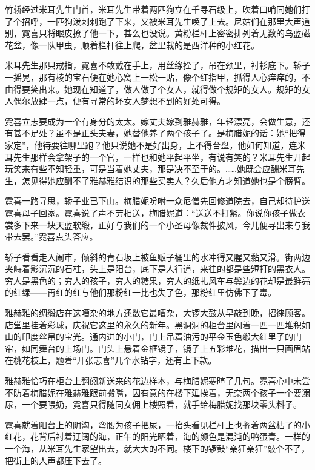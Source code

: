 \par 竹轿经过米耳先生门首，米耳先生带着两匹狗立在千寻石级上，吹着口哨同她们打了个招呼，一匹狗泼剌剌跑了下来，又被米耳先生唤了上去。尼姑们在那里大声道别，霓喜只将眼皮撩了他一下，甚么也没说。黄粉栏杆上密密排列着无数的乌蓝磁花盆，像一队甲虫，顺着栏杆往上爬，盆里栽的是西洋种的小红花。
\par 米耳先生那只戒指，霓喜不敢戴在手上，用丝绦拴了，吊在颈里，衬衫底下。轿子一摇晃，那有棱的宝石便在她心窝上一松一贴，像个红指甲，抓得人心痒痒的，不由得要笑出来。她现在知道了，做人做了个女人，就得做个规矩的女人。规矩的女人偶尔放肆一点，便有寻常的坏女人梦想不到的好处可得。
\par 霓喜立志要成为一个有身分的太太。嫁丈夫嫁到雅赫雅，年轻漂亮，会做生意，还有甚不足处？虽不是正头夫妻，她替他养了两个孩子了。是梅腊妮的话：她“把得家定”，他待要往哪里跑？他只说她不是好出身，上不得台盘，他如何知道，连米耳先生那样会拿架子的一个官，一样也和她平起平坐，有说有笑的？米耳先生开起玩笑来有些不知轻重，可是当着她丈夫，那是决不至于的。……她既会应酬米耳先生，怎见得她应酬不了雅赫雅结识的那些买卖人？久后他方才知道她也是个膀臂。
\par 霓喜一路寻思，轿子业已下山。梅腊妮吩咐一众尼僧先回修道院去，自己却待护送霓喜母子回家。霓喜说了声不劳相送，梅腊妮道：“送送不打紧。你说你孩子做衣裳多下来一块天蓝软缎，正好与我们的一个小圣母像裁件披风，今儿便寻出来与我带去罢。”霓喜点头答应。
\par 轿子看看走入闹市，倾斜的青石坂上被鱼贩子桶里的水冲得又腥又黏又滑。街两边夹峙着影沉沉的石柱，头上是阳台，底下是人行道，来往的都是些短打的黑衣人。穷人是黑色的；穷人的孩子，穷人的糖果，穷人的纸扎风车与鬓边的花却是最鲜亮的红绿——再红的红与他们那粉红一比也失了色，那粉红里仿佛下了毒。
\par 雅赫雅的绸缎店在这嘈杂的地方还数它最嘈杂，大锣大鼓从早敲到晚，招徕顾客。店堂里挂着彩球，庆祝它这里的永久的新年。黑洞洞的柜台里闪着一匹一匹堆积如山的印度丝帛的宝光。通内进的小门，门上吊着油污的平金玉色缎大红里子的门帘，如同舞台的上场门。门头上悬着金框镜子，镜子上五彩堆花，描出一只画眉站在桃花枝上，题着“开张志喜”几个水钻字，还有上下款。
\par 雅赫雅恰巧在柜台上翻阅新送来的花边样本，与梅腊妮寒暄了几句。霓喜心中未尝不防着梅腊妮在雅赫雅跟前搬嘴，因有意的在楼下延挨着，无奈两个孩子一个要溺尿，一个要喂奶，霓喜只得随同女佣上楼照看，就手给梅腊妮找那块零头料子。
\par 霓喜就着阳台上的阴沟，弯腰为孩子把尿，一抬头看见栏杆上也搁着两盆枯了的小红花，花背后衬着辽阔的海，正午的阳光晒着，海的颜色是混沌的鸭蛋青。一样的一个海，从米耳先生家望出去，就大大的不同。楼下的锣鼓“亲狂亲狂”敲个不了，把街上的人声都压下去了。
